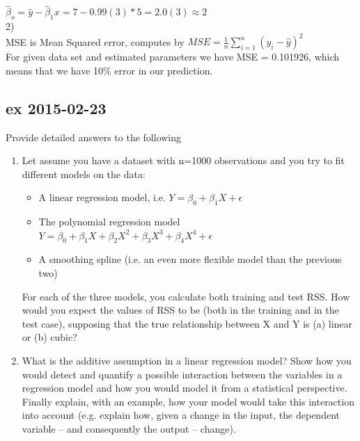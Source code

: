 \documentclass[a4paper,12pt,titlepage]{article} %
\begin{document}
$ \hat{\beta}_{o} = \hat{y} - \hat{\beta}_{1} x = 7 - 0.99(3) * 5 = 2.0(3) \approx 2 $ \\

2)\\
MSE is Mean Squared error, computes by $ MSE = \frac{1}{n} \sum_{i=1}^{n} (y_{i}-\hat{y})^{2} $\\

For given data set and estimated parameters we have MSE = 0.101926, which means that we have 10\% error in our prediction.

\subsection{ex 2015-02-23}
Provide detailed answers to the following
\begin{enumerate}
\item Let assume you have a dataset with n=1000 observations and you try to fit different
  models on the data:
  \begin{itemize}
\item A linear regression model, i.e. $ Y = \beta_{0} + \beta_{1} X + \epsilon $
\item The polynomial regression model $ Y = \beta_{0} + \beta_{1} X + \beta_{2} X^{2} + \beta_{3} X^{3} + \beta_{4} X^{4} +  \epsilon $
\item A smoothing spline (i.e. an even more flexible model than the previous two)
  \end{itemize}
 For each of the three models, you calculate both training and test RSS. How would you expect the values of RSS to be (both in the training and in the test case), supposing that the true relationship between X and Y is (a) linear or (b) cubic?
\item What is the additive assumption in a linear regression model? Show how you would detect and quantify a possible interaction between the variables in a regression model and how you would model it from a statistical perspective. Finally explain, with an example, how your model would take this interaction into account (e.g. explain how, given a change in the input, the dependent variable – and consequently the output – change).
\end{enumerate}
\end{document}
